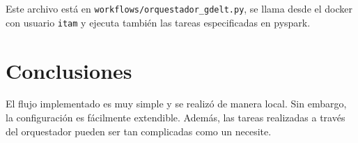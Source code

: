 \documentclass[]{article}
\begin{document}
Este archivo está en \texttt{workflows/orquestador\_gdelt.py}, se llama
desde el docker con usuario \texttt{itam} y ejecuta también las tareas
especificadas en pyspark.

\section{Conclusiones}\label{conclusiones}

El flujo implementado es muy simple y se realizó de manera local. Sin
embargo, la configuración es fácilmente extendible. Además, las tareas
realizadas a través del orquestador pueden ser tan complicadas como un
necesite.
\end{document}

